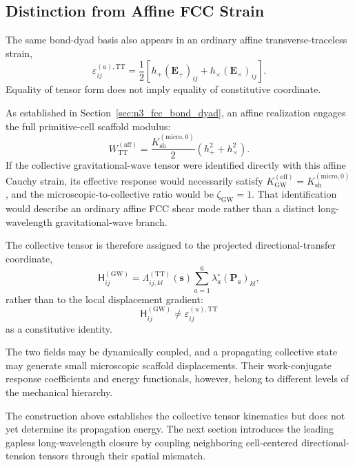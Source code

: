 \subsection{Distinction from Affine FCC Strain}
\label{subsec:distinction_affine_strain}

The same bond-dyad basis also appears in an ordinary affine transverse-traceless strain,
\begin{equation}
    \varepsilon_{ij}^{(u),\mathrm{TT}} = \frac{1}{2} \left[ h_{+}(\mathbf{E}_{+})_{ij} + h_{\times}(\mathbf{E}_{\times})_{ij} \right].
\end{equation}
Equality of tensor form does not imply equality of constitutive coordinate.

As established in Section~\ref{sec:n3_fcc_bond_dyad}, an affine realization engages the full primitive-cell scaffold modulus:
\begin{equation}
    W_{\mathrm{TT}}^{(\mathrm{aff})} = \frac{K_{\mathrm{sh}}^{(\mathrm{micro},0)}}{2} \left( h_{+}^{2} + h_{\times}^{2} \right).
\end{equation}
If the collective gravitational-wave tensor were identified directly with this affine Cauchy strain, its effective response would necessarily satisfy $K_{\mathrm{GW}}^{(\mathrm{eff})} = K_{\mathrm{sh}}^{(\mathrm{micro},0)}$, and the microscopic-to-collective ratio would be $\zeta_{\mathrm{GW}}=1$. That identification would describe an ordinary affine FCC shear mode rather than a distinct long-wavelength gravitational-wave branch.

The collective tensor is therefore assigned to the projected directional-transfer coordinate,
\begin{equation}
    \mathsf{H}_{ij}^{(\mathrm{GW})} = \Lambda_{ij,kl}^{(\mathrm{TT})}(\mathbf{s}) \sum_{a=1}^{6} \lambda_{a}^{\circ} (\mathbf{P}_{a})_{kl},
\end{equation}
rather than to the local displacement gradient:
\begin{equation}
    \mathsf{H}_{ij}^{(\mathrm{GW})} \neq \varepsilon_{ij}^{(u),\mathrm{TT}}
\end{equation}
as a constitutive identity.

The two fields may be dynamically coupled, and a propagating collective state may generate small microscopic scaffold displacements. Their work-conjugate response coefficients and energy functionals, however, belong to different levels of the mechanical hierarchy.

The construction above establishes the collective tensor kinematics but does not yet determine its propagation energy. The next section introduces the leading gapless long-wavelength closure by coupling neighboring cell-centered directional-tension tensors through their spatial mismatch.

